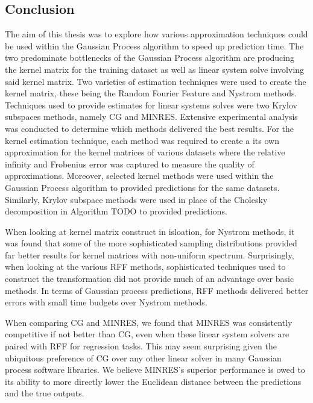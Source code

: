 \subsection{Conclusion}\label{Section5.4}

The aim of this thesis was to explore how various approximation techniques could be used within the Gaussian Process algorithm to speed up prediction time. The two predominate bottlenecks of the Gaussian Process algorithm are producing the kernel matrix for the training dataset as well as linear system solve involving said kernel matrix. Two varieties of estimation techniques were used to create the kernel matrix, these being the Random Fourier Feature and Nystrom methods. Techniques used to provide estimates for linear systems solves were two Krylov subspaces methods, namely CG and MINRES. Extensive experimental analysis was conducted to determine which methods delivered the best results. For the kernel estimation technique, each method was required to create a its own approximation for the kernel matrices of various datasets where the relative infinity and Frobenius error was captured to measure the quality of approximations. Moreover, selected kernel methods were used within the Gaussian Process algorithm to provided predictions for the same datasets. Similarly, Krylov subspace methods were used in place of the Cholesky decomposition in Algorithm TODO to provided predictions.

When looking at kernel matrix construct in isloation, for Nystrom methods, it was found that some of the more sophisticated sampling distributions provided far better results for kernel matrices with non-uniform spectrum. Surprisingly, when looking at the various RFF methods, sophisticated techniques used to construct the transformation did not provide much of an advantage over basic methods. In terms of Gaussian process predictions, RFF methods delivered better errors with small time budgets over Nystrom methods.

When comparing CG and MINRES, we found that MINRES was consistently competitive if not better than CG, even when these linear system solvers are paired with RFF for regression tasks. This may seem surprising given the ubiquitous preference of CG over any other linear solver in many Gaussian process software libraries. We believe MINRES's superior performance is owed to its ability to more directly lower the Euclidean distance between the predictions and the true outputs.

